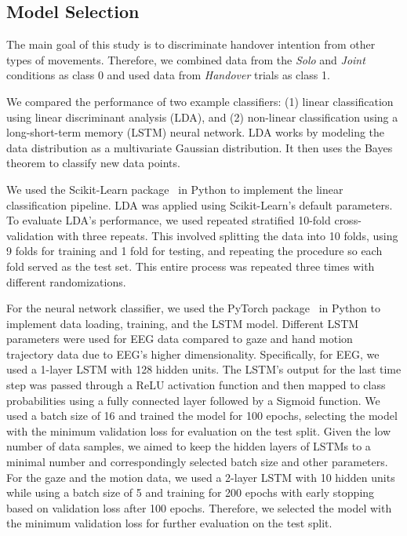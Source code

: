 


\subsection*{Model Selection}

The main goal of this study is to discriminate handover intention from other types of movements. Therefore, we combined data from the \emph{Solo} and \emph{Joint} conditions as class 0 and used data from \emph{Handover} trials as class 1. 

We compared the performance of two example classifiers: (1) linear classification using linear discriminant analysis (LDA), and (2) non-linear classification using a long-short-term memory (LSTM) neural network. LDA works by modeling the data distribution as a multivariate Gaussian distribution. It then uses the Bayes theorem to classify new data points. 

We used the Scikit-Learn package~\cite{scikit-learn} in Python to implement the linear classification pipeline. LDA was applied using Scikit-Learn’s default parameters. To evaluate LDA’s performance, we used repeated stratified 10-fold cross-validation with three repeats. This involved splitting the data into 10 folds, using 9 folds for training and 1 fold for testing, and repeating the procedure so each fold served as the test set. This entire process was repeated three times with different randomizations.

For the neural network classifier, we used the PyTorch package~\cite{paszke2019pytorch} in Python to implement data loading, training, and the LSTM model. Different LSTM parameters were used for EEG data compared to gaze and hand motion trajectory data due to EEG's higher dimensionality. Specifically, for EEG, we used a 1-layer LSTM with 128 hidden units. The LSTM's output for the last time step was passed through a ReLU activation function and then mapped to class probabilities using a fully connected layer followed by a Sigmoid function. We used a batch size of 16 and trained the model for 100 epochs, selecting the model with the minimum validation loss for evaluation on the test split. Given the low number of data samples, we aimed to keep the hidden layers of LSTMs to a minimal number and correspondingly selected batch size and other parameters. For the gaze and the motion data, we used a 2-layer LSTM with 10 hidden units while using a batch size of 5 and training for 200 epochs with early stopping based on validation loss after 100 epochs. Therefore, we selected the model with the minimum validation loss for further evaluation on the test split.

